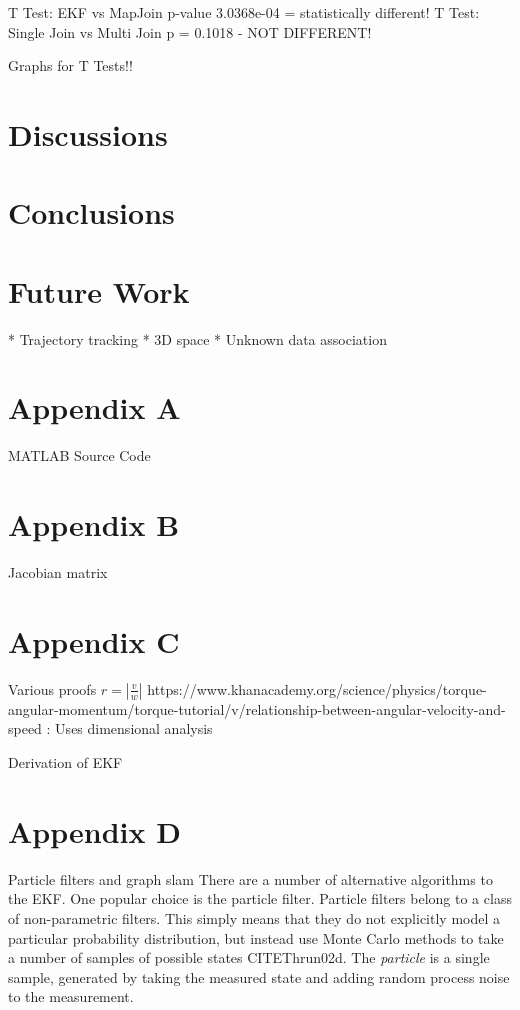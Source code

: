 \documentclass[12pt]{report}
\begin{document}
T Test: EKF vs MapJoin
p-value 3.0368e-04  = statistically different!
T Test: Single Join vs Multi Join  p = 0.1018 - NOT DIFFERENT!

Graphs for T Tests!!

\chapter{Discussions}

\chapter{Conclusions}

\chapter{Future Work}

* Trajectory tracking
* 3D space
* Unknown data association

\chapter{Appendix A}
MATLAB Source Code

\chapter{Appendix B}
Jacobian matrix

\chapter{Appendix C}
Various proofs
$r = |\frac{v}{w}|$
 https://www.khanacademy.org/science/physics/torque-angular-momentum/torque-tutorial/v/relationship-between-angular-velocity-and-speed 
: Uses dimensional analysis

Derivation of EKF

\chapter{Appendix D}
Particle filters and graph slam
There are a number of alternative algorithms to the EKF.  One popular choice is the particle filter.  Particle filters belong to a class of non-parametric filters.  This simply means that they do not explicitly model a particular probability distribution, but instead use Monte Carlo methods to take a number of samples of possible states CITE{Thrun02d}.   The \emph{particle} is a single sample, generated by taking the measured state and adding random process noise to the measurement.  
\end{document}
